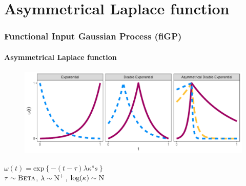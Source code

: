 \documentclass{snedecorbeamer}
\begin{document}

\section{Asymmetrical Laplace function}

\begin{frame}
  \frametitle{Functional Input Gaussian Process (fiGP)}
  \framesubtitle{Asymmetrical Laplace function}

  \begin{figure}[h!]
	\centering
    \includegraphics[width=.7\textwidth]{02-alf-weight-plot}%
  \end{figure}
  \begin{center}
    $\omega(t) = \text{exp}\left\{-(t - \tau) \lambda \kappa^s s\right\}$\\
    $\tau \sim \textsc{Beta}$,
    $\lambda \sim \textsc{N}^{+}$,
    $\log(\kappa) \sim \textsc{N}$
  \end{center}

  \blankfootnote{
    $\omega(t): \mathcal{T} = [0, 1] \to (0, 1]$,
    $s = \text{sign}(t - \tau)$,
    $\tau > 0$,
    $\lambda > 0$,
    $\kappa > 0$
  }
\end{frame}
\end{document}

